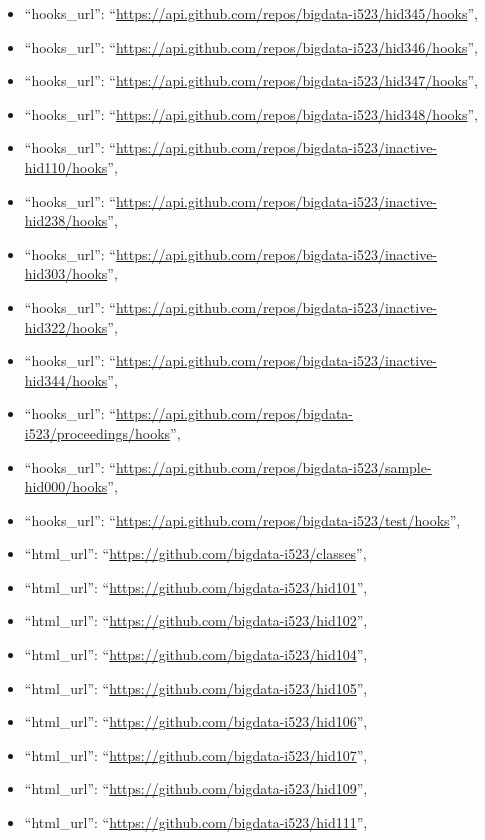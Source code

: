 \begin{itemize}
\item
  ``hooks\_url'':
  ``\url{https://api.github.com/repos/bigdata-i523/hid345/hooks}'',
\item
  ``hooks\_url'':
  ``\url{https://api.github.com/repos/bigdata-i523/hid346/hooks}'',
\item
  ``hooks\_url'':
  ``\url{https://api.github.com/repos/bigdata-i523/hid347/hooks}'',
\item
  ``hooks\_url'':
  ``\url{https://api.github.com/repos/bigdata-i523/hid348/hooks}'',
\item
  ``hooks\_url'':
  ``\url{https://api.github.com/repos/bigdata-i523/inactive-hid110/hooks}'',
\item
  ``hooks\_url'':
  ``\url{https://api.github.com/repos/bigdata-i523/inactive-hid238/hooks}'',
\item
  ``hooks\_url'':
  ``\url{https://api.github.com/repos/bigdata-i523/inactive-hid303/hooks}'',
\item
  ``hooks\_url'':
  ``\url{https://api.github.com/repos/bigdata-i523/inactive-hid322/hooks}'',
\item
  ``hooks\_url'':
  ``\url{https://api.github.com/repos/bigdata-i523/inactive-hid344/hooks}'',
\item
  ``hooks\_url'':
  ``\url{https://api.github.com/repos/bigdata-i523/proceedings/hooks}'',
\item
  ``hooks\_url'':
  ``\url{https://api.github.com/repos/bigdata-i523/sample-hid000/hooks}'',
\item
  ``hooks\_url'':
  ``\url{https://api.github.com/repos/bigdata-i523/test/hooks}'',
\item
  ``html\_url'': ``\url{https://github.com/bigdata-i523/classes}'',
\item
  ``html\_url'': ``\url{https://github.com/bigdata-i523/hid101}'',
\item
  ``html\_url'': ``\url{https://github.com/bigdata-i523/hid102}'',
\item
  ``html\_url'': ``\url{https://github.com/bigdata-i523/hid104}'',
\item
  ``html\_url'': ``\url{https://github.com/bigdata-i523/hid105}'',
\item
  ``html\_url'': ``\url{https://github.com/bigdata-i523/hid106}'',
\item
  ``html\_url'': ``\url{https://github.com/bigdata-i523/hid107}'',
\item
  ``html\_url'': ``\url{https://github.com/bigdata-i523/hid109}'',
\item
  ``html\_url'': ``\url{https://github.com/bigdata-i523/hid111}'',

\end{itemize}
